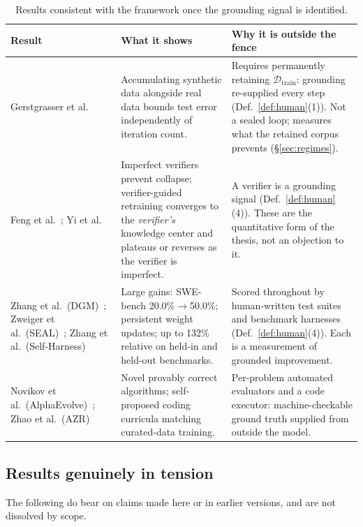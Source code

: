 \documentclass[11pt,a4paper]{article}
\newcommand{\toprule}{\hline}
\newcommand{\midrule}{\hline}
\newcommand{\bottomrule}{\hline}
\begin{document}
\begin{table}[h]
\centering
\small
\begin{tabular}{@{}p{4.0cm}p{4.6cm}p{5.5cm}@{}}
\toprule
\textbf{Result} & \textbf{What it shows} & \textbf{Why it is outside the fence} \\
\midrule
Gerstgrasser et al.~\cite{gerstgrasser2024accumulate} &
Accumulating synthetic data alongside real data bounds test error independently of iteration count. &
Requires permanently retaining $\mathcal{D}_{\mathrm{train}}$: grounding re-supplied every step (Def.~\ref{def:human}(1)). Not a sealed loop; measures what the retained corpus prevents (\S\ref{sec:regimes}). \\[3pt]
Feng et al.~\cite{feng2024verification}; Yi et al.~\cite{yi2026escaping} &
Imperfect verifiers prevent collapse; verifier-guided retraining converges to the \emph{verifier's} knowledge center and plateaus or reverses as the verifier is imperfect. &
A verifier is a grounding signal (Def.~\ref{def:human}(4)). These are the quantitative form of the thesis, not an objection to it. \\[3pt]
Zhang et al.\ (DGM)~\cite{zhang2025dgm}; Zweiger et al.\ (SEAL)~\cite{zweiger2025seal}; Zhang et al.\ (Self-Harness)~\cite{zhang2026selfharness} &
Large gains: SWE-bench 20.0\%$\to$50.0\%; persistent weight updates; up to 132\% relative on held-in and held-out benchmarks. &
Scored throughout by human-written test suites and benchmark harnesses (Def.~\ref{def:human}(4)). Each is a measurement of grounded improvement. \\[3pt]
Novikov et al.\ (AlphaEvolve)~\cite{novikov2025alphaevolve}; Zhao et al.\ (AZR)~\cite{zhao2025azr} &
Novel provably correct algorithms; self-proposed coding curricula matching curated-data training. &
Per-problem automated evaluators and a code executor: machine-checkable ground truth supplied from outside the model. \\
\bottomrule
\end{tabular}
\caption{Results consistent with the framework once the grounding signal is identified.}
\label{tab:scope}
\end{table}

\subsection{Results genuinely in tension}

The following do bear on claims made here or in earlier versions, and are not dissolved by scope.
\end{document}
